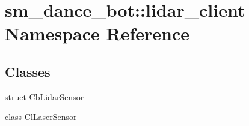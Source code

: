 \hypertarget{namespacesm__dance__bot_1_1lidar__client}{}\section{sm\+\_\+dance\+\_\+bot\+:\+:lidar\+\_\+client Namespace Reference}
\label{namespacesm__dance__bot_1_1lidar__client}
\subsection*{Classes}
\begin{DoxyCompactItemize}
\item 
struct \hyperlink{structsm__dance__bot_1_1lidar__client_1_1CbLidarSensor}{Cb\+Lidar\+Sensor}
\item 
class \hyperlink{classsm__dance__bot_1_1lidar__client_1_1ClLaserSensor}{Cl\+Laser\+Sensor}
\end{DoxyCompactItemize}

